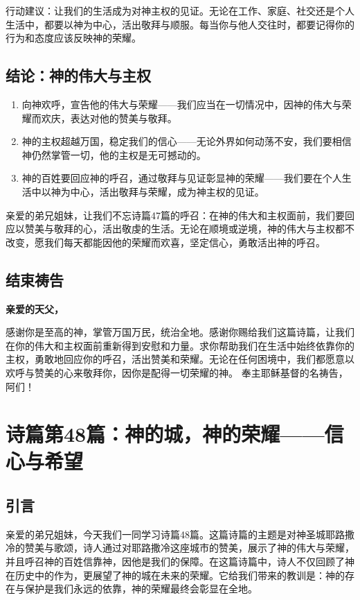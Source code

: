 \documentclass[a4paper, 12pt]{article}
\begin{document}
行动建议：让我们的生活成为对神主权的见证。无论在工作、家庭、社交还是个人生活中，都要以神为中心，活出敬拜与顺服。每当你与他人交往时，都要记得你的行为和态度应该反映神的荣耀。
\subsection*{结论：神的伟大与主权}
\begin{enumerate}
    \item 向神欢呼，宣告他的伟大与荣耀——我们应当在一切情况中，因神的伟大与荣耀而欢庆，表达对他的赞美与敬拜。

    \item 神的主权超越万国，稳定我们的信心——无论外界如何动荡不安，我们要相信神仍然掌管一切，他的主权是无可撼动的。

    \item 神的百姓要回应神的呼召，通过敬拜与见证彰显神的荣耀——我们要在个人生活中以神为中心，活出敬拜与荣耀，成为神主权的见证。

\end{enumerate}

亲爱的弟兄姐妹，让我们不忘诗篇47篇的呼召：在神的伟大和主权面前，我们要回应以赞美与敬拜的心，活出敬虔的生活。无论在顺境或逆境，神的伟大与主权都不改变，愿我们每天都能因他的荣耀而欢喜，坚定信心，勇敢活出神的呼召。

\subsection*{结束祷告}
\textbf{亲爱的天父，}

感谢你是至高的神，掌管万国万民，统治全地。感谢你赐给我们这篇诗篇，让我们在你的伟大和主权面前重新得到安慰和力量。求你帮助我们在生活中始终依靠你的主权，勇敢地回应你的呼召，活出赞美和荣耀。无论在任何困境中，我们都愿意以欢呼与赞美的心来敬拜你，因你是配得一切荣耀的神。
奉主耶稣基督的名祷告，阿们！
\newpage
\section{诗篇第48篇：神的城，神的荣耀——信心与希望}
\subsection*{引言}
亲爱的弟兄姐妹，今天我们一同学习诗篇48篇。这篇诗篇的主题是对神圣城耶路撒冷的赞美与歌颂，诗人通过对耶路撒冷这座城市的赞美，展示了神的伟大与荣耀，并且呼召神的百姓信靠神，因他是我们的保障。在这篇诗篇中，诗人不仅回顾了神在历史中的作为，更展望了神的城在未来的荣耀。它给我们带来的教训是：神的存在与保护是我们永远的依靠，神的荣耀最终会彰显在全地。
\end{document}
